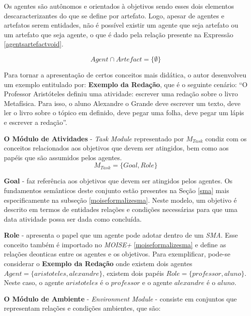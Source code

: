 Os agentes são autônomos e orientados à objetivos sendo esses dois elementos descaracterizantes do que se define por artefato. Logo, apesar de agentes e artefatos serem entidades, não é possível existir um agente que seja artefato ou um artefato que seja agente, o que é dado pela relação presente na Expressão \ref{agentsartefactvoid}. 

\begin{equation} \label{agentsartefactvoid}
    Agent \cap Artefact = \{ \emptyset \}
\end{equation}

Para tornar a apresentação de certos conceitos mais didática, o autor desenvolveu um exemplo entitulado por: \textbf{Exemplo da Redação}, que é o seguinte cenário: ``O Professor Aristóteles definiu uma atividade: escrever uma redação sobre o livro Metafísica. Para isso, o aluno Alexandre o Grande deve escrever um texto, deve ler o livro sobre o tópico em definido, deve pegar uma folha, deve pegar um lápis e escrever a redação''.  


\textbf{O Módulo de Atividades} - \textit{Task Module} representado por $M_{Task}$ condiz com os conceitos relacionados aos objetivos que devem ser atingidos, bem como aos papéis que são assumidos pelos agentes.
\begin{equation}
    M_{Task} = \{ Goal, Role \}
\end{equation}

\textbf{Goal} - faz referência aos objetivos que devem ser atingidos pelos agentes. Os fundamentos semânticos deste conjunto estão presentes na Seção \ref{sma} mais especificamente na subseção \ref{moiseformalizesma}. Neste modelo, um objetivo é descrito em termos de entidades relações e condições necessárias para que uma data atividade possa ser dada como concluída. 

\textbf{Role} - apresenta o papel que um agente pode adotar dentro de um \textit{SMA}. Esse conceito também é importado no \textit{MOISE+} 
\ref{moiseformalizesma} e define as relações deonticas entre os agentes e os objetivos. Para exemplificar, pode-se considerar o \textbf{Exemplo da Redação} onde existem dois agentes $Agent = \{ aristoteles, alexandre \}$, existem dois papéis $Role = \{ professor, aluno\}$. Neste caso, o agente $aristoteles$ é o $professor$ e o agente $alexandre$ é o $aluno$.

\textbf{O Módulo de Ambiente} - \textit{Environment Module} - consiste em conjuntos que representam relações e condições ambientes, que são:

